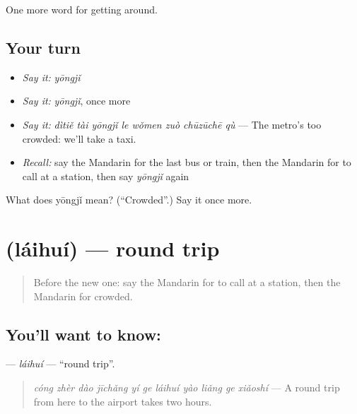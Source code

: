 \begin{grammarlens}[title={What you've built}]
One more word for getting around.
\end{grammarlens}

\subsection*{Your turn}
\begin{itemize}
\raggedright
  \item \emph{Say it:} \emph{yōngjǐ}
  \item \emph{Say it:} \emph{yōngjǐ}, once more
  \item \emph{Say it:} \emph{dìtiě tài yōngjǐ le wǒmen zuò chūzūchē qù} — The metro's too crowded: we'll take a taxi.
  \item \emph{Recall:} say the Mandarin for the last bus or train, then the Mandarin for to call at a station, then say \emph{yōngjǐ} again
\end{itemize}

\begin{tcolorbox}[breakable,colback=teal!4,colframe=teal!35!black,title={Before you move on}]
What does yōngjǐ mean? (\textquotedblleft{}Crowded\textquotedblright{}.) Say it once more.
\end{tcolorbox}
\section[\texorpdfstring{\zh{来回} (láihuí)}{来回 (láihuí)}]{ (láihuí) — round trip}

\label{lesson:ZH-C406-laihui}



\begin{quote}
Before the new one: say the Mandarin for to call at a station, then the Mandarin for crowded.
\end{quote}

\subsection*{You'll want to know: }
\textbf{} — \emph{láihuí} — \textquotedblleft{}round trip\textquotedblright{}.

\begin{quote}
\emph{cóng zhèr dào jīchǎng yí ge láihuí yào liǎng ge xiǎoshí} — A round trip from here to the airport takes two hours.
\end{quote}

